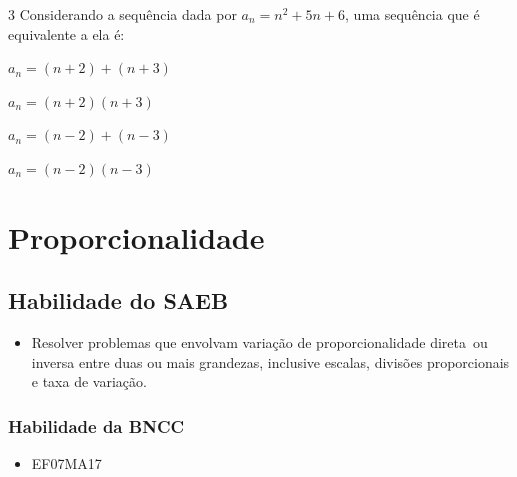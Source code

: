 \num{3} Considerando a sequência dada por $a_{n} = n^{2} + 5n + 6$, uma
sequência que é equivalente a ela é:

\begin{multicols}{2}
\begin{escolha}[itemsep=0pt]
\item $a_{n} = (n + 2) + (n + 3)$
\item $a_{n} = (n + 2)(n + 3)$
\item $a_{n} = (n - 2) + (n - 3)$
\item $a_{n} = (n - 2)(n - 3)$
\end{escolha}
\end{multicols}




\chapter{Proporcionalidade}

\section*{Habilidade do SAEB}
\begin{itemize}
\item Resolver problemas que envolvam variação de
proporcionalidade direta~ou inversa entre duas ou mais grandezas,
inclusive escalas, divisões proporcionais e taxa de variação.
\end{itemize}

\subsection{Habilidade da BNCC}
\begin{itemize}
\item EF07MA17
\end{itemize}

